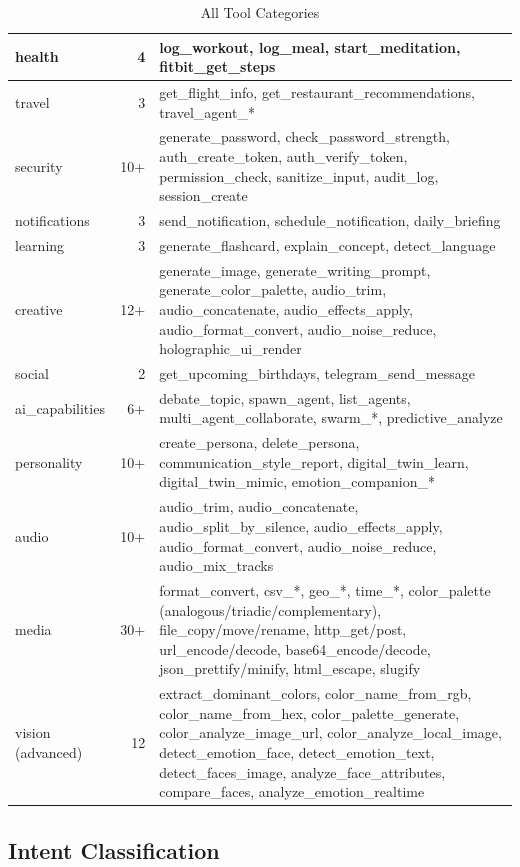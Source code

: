 \documentclass[12pt,a4paper,twoside]{report}
\begin{document}
\begin{table}[H]
\begin{tabularx}{\textwidth}{|l|r|X|}
\hline
health & 4 & log\_workout, log\_meal, start\_meditation, fitbit\_get\_steps \\
\hline
travel & 3 & get\_flight\_info, get\_restaurant\_recommendations, travel\_agent\_* \\
\hline
security & 10+ & generate\_password, check\_password\_strength, auth\_create\_token, auth\_verify\_token, permission\_check, sanitize\_input, audit\_log, session\_create \\
\hline
notifications & 3 & send\_notification, schedule\_notification, daily\_briefing \\
\hline
learning & 3 & generate\_flashcard, explain\_concept, detect\_language \\
\hline
creative & 12+ & generate\_image, generate\_writing\_prompt, generate\_color\_palette, audio\_trim, audio\_concatenate, audio\_effects\_apply, audio\_format\_convert, audio\_noise\_reduce, holographic\_ui\_render \\
\hline
social & 2 & get\_upcoming\_birthdays, telegram\_send\_message \\
\hline
ai\_capabilities & 6+ & debate\_topic, spawn\_agent, list\_agents, multi\_agent\_collaborate, swarm\_*, predictive\_analyze \\
\hline
personality & 10+ & create\_persona, delete\_persona, communication\_style\_report, digital\_twin\_learn, digital\_twin\_mimic, emotion\_companion\_* \\
\hline
audio & 10+ & audio\_trim, audio\_concatenate, audio\_split\_by\_silence, audio\_effects\_apply, audio\_format\_convert, audio\_noise\_reduce, audio\_mix\_tracks \\
\hline
media & 30+ & format\_convert, csv\_*, geo\_*, time\_*, color\_palette (analogous/triadic/complementary), file\_copy/move/rename, http\_get/post, url\_encode/decode, base64\_encode/decode, json\_prettify/minify, html\_escape, slugify \\
\hline
vision (advanced) & 12 & extract\_dominant\_colors, color\_name\_from\_rgb, color\_name\_from\_hex, color\_palette\_generate, color\_analyze\_image\_url, color\_analyze\_local\_image, detect\_emotion\_face, detect\_emotion\_text, detect\_faces\_image, analyze\_face\_attributes, compare\_faces, analyze\_emotion\_realtime \\
\hline
\end{tabularx}
\caption{All Tool Categories}
\end{table}

\subsection{Intent Classification}
\end{document}
